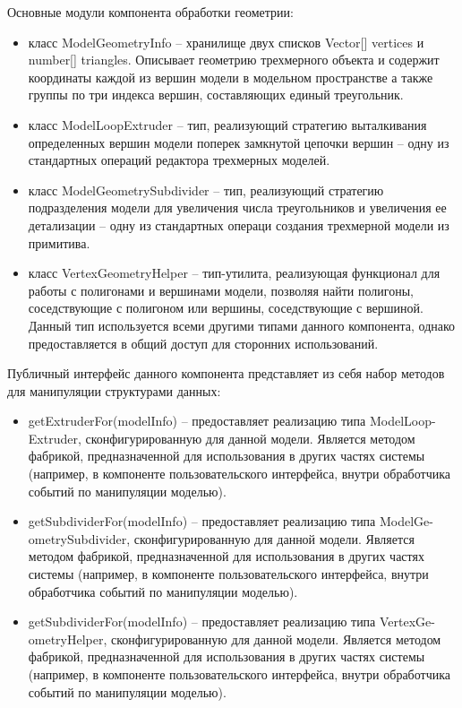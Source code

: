 Основные модули компонента обработки геометрии:
\begin{itemize}
\item класс ModelGeometryInfo -- хранилище двух списков Vector[] vertices и number[] triangles. Описывает геометрию трехмерного объекта и содержит координаты каждой из вершин модели в
модельном пространстве а также группы по три индекса вершин, составляющих единый треугольник.
\item класс ModelLoopExtruder -- тип, реализующий стратегию выталкивания определенных вершин модели поперек замкнутой цепочки вершин -- одну из стандартных операций редактора трехмерных моделей.
\item класс ModelGeometrySubdivider -- тип, реализующий стратегию подразделения модели для увеличения числа треугольников и увеличения ее детализации -- одну из стандартных операци создания
трехмерной модели из примитива.
\item класс VertexGeometryHelper -- тип-утилита, реализующая функционал для работы с полигонами и вершинами модели, позволяя найти полигоны, соседствующие с полигоном или вершины, соседствующие
с вершиной. Данный тип используется всеми другими типами данного компонента, однако предоставляется в общий доступ для сторонних использований.
\end{itemize}

Публичный интерфейс данного компонента представляет из себя набор методов для манипуляции структурами данных:
\begin{itemize}
\item getExtruderFor(modelInfo) -- предоставляет реализацию типа ModelLoop-Extruder, сконфигурированную для данной модели. Является методом фабрикой, предназначенной для использования в других
частях системы (например, в компоненте пользовательского интерфейса, внутри обработчика событий по манипуляции моделью).
\item getSubdividerFor(modelInfo) -- предоставляет реализацию типа ModelGe-ometrySubdivider, сконфигурированную для данной модели. Является методом фабрикой, предназначенной для использования в других
частях системы (например, в компоненте пользовательского интерфейса, внутри обработчика событий по манипуляции моделью).
\item getSubdividerFor(modelInfo) -- предоставляет реализацию типа VertexGe-ometryHelper, сконфигурированную для данной модели. Является методом фабрикой, предназначенной для использования в других
частях системы (например, в компоненте пользовательского интерфейса, внутри обработчика событий по манипуляции моделью).
\end{itemize}